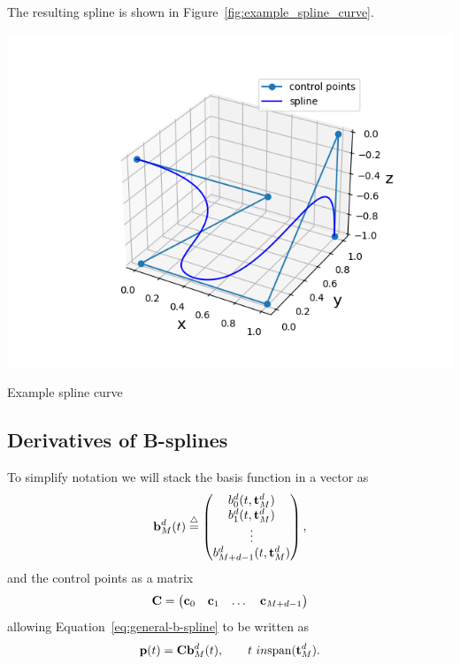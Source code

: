 The resulting spline is shown in Figure~\ref{fig:example_spline_curve}.
\begin{marginfigure}[0in]
  \includegraphics[width=\linewidth]{./chap5_trajectory_planning/figures/example_spline_curve}
  \caption{Example spline curve}
  \label{fig:example_spline_curve}  
\end{marginfigure}

\subsection{Derivatives of B-splines}


To simplify notation we will stack the basis function in a vector as
\begin{equation}\label{eq:basis_vector}
\bbf_M^d(t) \defeq \begin{pmatrix} b_0^d(t, \mathbf{t}_M^d) \\ b_1^d(t, \mathbf{t}_M^d) \\ \vdots \\ b_{M+d-1}^d(t, \mathbf{t}_M^d) \end{pmatrix}, 
\end{equation}
and the control points as a matrix 
\[
\mathbf{C} = \begin{pmatrix} \mathbf{c}_0 & \mathbf{c}_1 & \dots & \mathbf{c}_{M+d-1} \end{pmatrix}
\]
allowing Equation~\eqref{eq:general-b-spline} to be written as
\[
\mathbf{p}(t) = \mathbf{C} \mathbf{b}_M^d(t), \qquad t\ in\text{span}(\mathbf{t}_M^d).
\]

